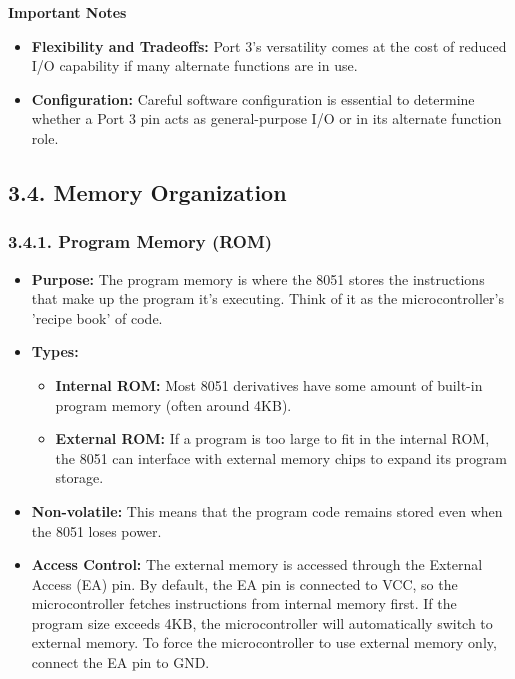 \documentclass[
]{article}
\begin{document}
\textbf{Important Notes}

\begin{itemize}
\item
  \textbf{Flexibility and Tradeoffs:} Port 3's versatility comes at the
  cost of reduced I/O capability if many alternate functions are in use.
\item
  \textbf{Configuration:} Careful software configuration is essential to
  determine whether a Port 3 pin acts as general-purpose I/O or in its
  alternate function role.
\end{itemize}

\hypertarget{34-memory-organization}{%
\subsection{3.4. Memory Organization}\label{34-memory-organization}}

\hypertarget{341-program-memory-rom}{%
\subsubsection{3.4.1. Program Memory
(ROM)}\label{341-program-memory-rom}}

\begin{itemize}
\item
  \textbf{Purpose:} The program memory is where the 8051 stores the
  instructions that make up the program it's executing. Think of it as
  the microcontroller's 'recipe book' of code.
\item
  \textbf{Types:}

  \begin{itemize}
  \item
    \textbf{Internal ROM:} Most 8051 derivatives have some amount of
    built-in program memory (often around 4KB).
  \item
    \textbf{External ROM:} If a program is too large to fit in the
    internal ROM, the 8051 can interface with external memory chips to
    expand its program storage.
  \end{itemize}
\item
  \textbf{Non-volatile:} This means that the program code remains stored
  even when the 8051 loses power.
\item
  \textbf{Access Control:} The external memory is accessed through the
  External Access (EA) pin. By default, the EA pin is connected to VCC,
  so the microcontroller fetches instructions from internal memory
  first. If the program size exceeds 4KB, the microcontroller will
  automatically switch to external memory. To force the microcontroller
  to use external memory only, connect the EA pin to GND.
\end{itemize}
\end{document}
